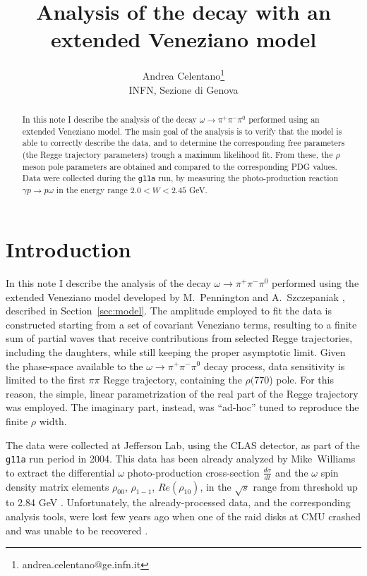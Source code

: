 \documentclass[a4paper,10pt]{report}
\author{Andrea Celentano\thanks{andrea.celentano@ge.infn.it}\\ \small{INFN, Sezione di Genova}}
\title{Analysis of the decay \decay with an extended Veneziano model}
\newcommand{\decay}{$\omega \rightarrow \pi^+ \pi^- \pi^0$ }
\newcommand{\production}{$\gamma p \rightarrow p \omega$ }
\begin{document}
\maketitle
\begin{abstract}
In this note I describe the analysis of the decay \decay performed using an extended Veneziano model.
The main goal of the analysis is to verify that the model is able to correctly describe the data, and to determine the corresponding free parameters (the Regge trajectory parameters) trough a maximum likelihood fit.
From these, the $\rho$ meson pole parameters are obtained and compared to the corresponding PDG values.
Data were collected during the \texttt{g11a} run, by measuring the photo-production reaction \production in the energy range $2.0< W < 2.45$ GeV. 

\end{abstract}
\tableofcontents
\chapter{Introduction}
In this note I describe the analysis of the decay \decay performed using the extended Veneziano model developed by M.~Pennington and A.~Szczepaniak \cite{Szczepaniak:2014qca},
described in Section~\ref{sec:model}.
The amplitude employed to fit the data is constructed starting from a set of covariant Veneziano terms, resulting to a finite sum of partial waves that receive contributions from selected Regge trajectories, including the daughters, while still keeping the
proper asymptotic limit. Given the phase-space available to the \decay decay process, data sensitivity is limited to the first $\pi \pi$ Regge trajectory, containing the $\rho(770$) pole. For this reason, the simple, linear parametrization of the real part of the Regge trajectory was employed. The imaginary
part, instead, was ``ad-hoc'' tuned to reproduce the finite $\rho$ width.

The data were collected at Jefferson Lab, using the CLAS detector, as part of the \texttt{g11a} run period in 2004. 
This data has been already analyzed by Mike~Williams to extract the differential $\omega$ photo-production cross-section $\frac{d\sigma}{dt}$
and the $\omega$ spin density matrix elements $\rho_{00}$, $\rho_{1-1}$, $Re(\rho_{10})$, in the $\sqrt{s}$ range  from threshold up to 2.84 GeV \cite{Williams:2009ab}. 
Unfortunately, the already-processed data, and the corresponding analysis tools, were lost few years ago when one of the raid disks at CMU crashed and was unable to be recovered \cite{BrianCommunication}.
\end{document}
